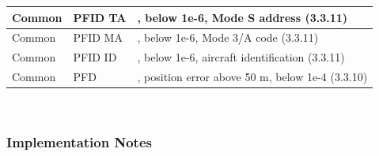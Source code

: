 \begin{center}
\begin{table}[H]
\begin{tabularx}{\textwidth}{ | l | l | X | }
    Common & PFID TA & \nameref{sec:eval_req_id_false}, below 1e-6, Mode S address (3.3.11) \\ \hline
    Common & PFID MA & \nameref{sec:eval_req_id_false}, below 1e-6, Mode 3/A code (3.3.11) \\ \hline
    Common & PFID ID & \nameref{sec:eval_req_id_false}, below 1e-6, aircraft identification (3.3.11) \\ \hline
    Common & PFD & \nameref{sec:eval_req_pos_distance}, position error above 50 m, below 1e-4 (3.3.10) \\ \hline
\end{tabularx}
\end{table}
\end{center}
\ \\

\subsubsection{Implementation Notes}


